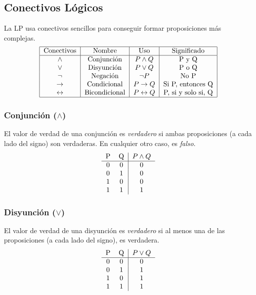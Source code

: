 \documentclass{article}
\begin{document}
\subsection{Conectivos Lógicos}
La LP usa conectivos sencillos para conseguir formar proposiciones más complejas. \\
\[
    \begin{tabular}{|c|c|c|c|}
        \hline
        Conectivos & Nombre & Uso & Significado\\ \hline
        $\wedge$ & Conjunción & $P \wedge{}Q$ & P y Q \\
        $\vee$ & Disyunción & $P \vee{}Q$ & P o Q \\
        $\neg$ & Negación & $\neg{}P$ & No P \\
        $\rightarrow$ & Condicional & $P \rightarrow{}Q$ & Si P, entonces Q \\
        $\leftrightarrow$ & Bicondicional & $P \leftrightarrow{}Q$ & P, si y solo si, Q \\ \hline
    \end{tabular}
\]
\subsubsection{Conjunción ($\wedge$)}
El valor de verdad de una conjunción es \textit{verdadero} si ambas proposiciones (a cada lado del signo) son verdaderas. En cualquier otro caso, es \textit{falso}.
\[
    \begin{tabular}{cc|c}
        P & Q & $P \wedge{}Q$\\ \hline
        0 & 0 & 0\\
        0 & 1 & 0\\
        1 & 0 & 0\\
        1 & 1 & 1
    \end{tabular}
\]

\subsubsection{Disyunción ($\vee$)}
El valor de verdad de una disyunción es \textit{verdadero} si al menos una de las proposiciones (a cada lado del signo), es verdadera.
\[
    \begin{tabular}{cc|c}
        P & Q & $P \vee{}Q$\\ \hline
        0 & 0 & 0\\
        0 & 1 & 1\\
        1 & 0 & 1\\
        1 & 1 & 1
    \end{tabular}
\]
\end{document}
